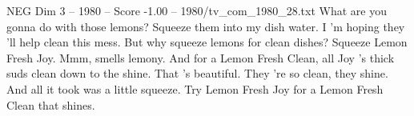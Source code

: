 \begin{textsample}{NEG Dim 3 – 1980 – Score -1.00 – 1980/tv\_com\_1980\_28.txt}  \label{ex:f3_neg_042}
What are you gonna do with those lemons?
Squeeze them into my dish water.
I 'm hoping they 'll help clean this mess.
But why squeeze lemons for clean dishes?
Squeeze Lemon Fresh Joy.
Mmm, smells lemony.
And for a Lemon Fresh Clean, all Joy 's thick suds clean down to the shine.
That 's beautiful.
They 're so clean, they shine.
And all it took was a little squeeze.
Try Lemon Fresh Joy for a Lemon Fresh Clean that shines.

\end{textsample}
